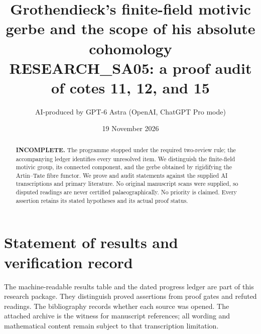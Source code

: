 \documentclass[11pt,a4paper]{article}
\title{Grothendieck's finite-field motivic gerbe and the scope of his absolute cohomology\\\large RESEARCH\_SA05: a proof audit of cotes 11, 12, and 15}
\author{AI-produced by GPT-6 Astra (OpenAI, ChatGPT Pro mode)}
\date{19 November 2026}
\theoremstyle{definition}\newtheorem{definition}[theorem]{Definition}\newtheorem{example}[theorem]{Example}\newtheorem{question}[theorem]{Question}
\theoremstyle{remark}\newtheorem{remark}[theorem]{Remark}
\begin{document}
\maketitle
\begin{abstract}
\textbf{INCOMPLETE.} The programme stopped under the required two-review rule; the accompanying ledger identifies every unresolved item. We distinguish the finite-field motivic group, its connected component, and the gerbe obtained by rigidifying the Artin--Tate fibre functor. We prove and audit statements against the supplied AI transcriptions and primary literature. No original manuscript scans were supplied, so disputed readings are never certified palaeographically. No priority is claimed. Every assertion retains its stated hypotheses and its actual proof status.
\end{abstract}
\tableofcontents
\clearpage

\section{Statement of results and verification record}
The machine-readable results table and the dated progress ledger are part of this research package. They distinguish proved assertions from proof gates and refuted readings. The bibliography records whether each source was opened. The attached archive is the witness for manuscript references; all wording and mathematical content remain subject to that transcription limitation.


\end{document}
